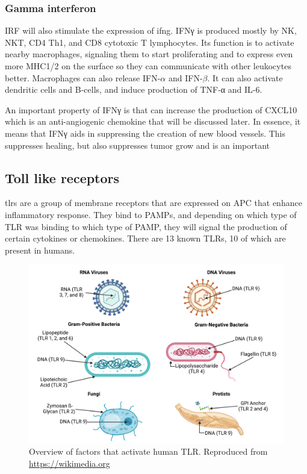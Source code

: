 \subsubsection{Gamma interferon}
\label{in:ITFG}

IRF will also stimulate the expression of \gls{ifng}. IFNγ is produced mostly by NK, NKT, CD4 Th1, and CD8 cytotoxic T lymphocytes. Its function is to activate nearby macrophages, signaling them to start proliferating and to express even more MHC1/2 on the surface so they can communicate with other leukocytes better. Macrophages can also release IFN-$\alpha$ and IFN-$\beta$. It can also activate dendritic cells and B-cells, and induce production of TNF-α and IL-6.

An important property of IFNγ is that can increase the production of CXCL10 which is an anti-angiogenic chemokine that will be discussed later. In essence, it means that IFNγ aids in suppressing the creation of new blood vessels. This suppresses healing, but also suppresses tumor grow and is an important 

\subsection{Toll like receptors}

\gls{tlrs} are a group of membrane receptors that are expressed on APC that enhance inflammatory response. They bind to PAMPs, and depending on which type of TLR was binding to which type of PAMP, they will signal the production of certain cytokines or chemokines. There are 13 known TLRs, 10 of which are present in humans.

    \begin{figure}[ht]
        \centering
            \includegraphics[width=0.7\linewidth]{figures/Inflammation/Toll-Like_Receptors_(TLRs).png } 
        \caption{Overview of factors that activate human TLR. Reproduced from \url{https://wikimedia.org}}
        \label{figure:TLRhell}
    \end{figure}

